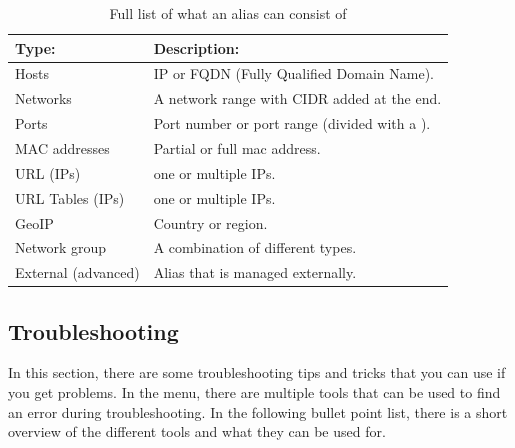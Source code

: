 \begin{table}[h!]
    \begin{center}
    \begin{tabular}{|l|l|}
    \hline
    \textbf{Type:} & \textbf{Description:} \\ \hline
    Hosts & IP or FQDN (Fully Qualified Domain Name). \\ \hline
    Networks & A network range with CIDR added at the end. \\ \hline
    Ports & Port number or port range (divided with a \cmd{:}). \\ \hline
    MAC addresses & Partial or full mac address. \\ \hline
    URL (IPs) & one or multiple IPs. \\ \hline
    URL Tables (IPs) & one or multiple IPs. \\ \hline
    GeoIP & Country or region. \\ \hline
    Network group & A combination of different types. \\ \hline
    External (advanced) & Alias that is managed externally. \\ \hline
    \end{tabular}
    \caption{Full list of what an alias can consist of}
    \label{tab:alias_types}
    \end{center}
\end{table}


\subsection{Troubleshooting}
In this section, there are some troubleshooting tips and tricks that you can use if you get problems. In the  menu, there are multiple tools that can be used to find an error during troubleshooting. In the following bullet point list, there is a short overview of the different tools and what they can be used for.

